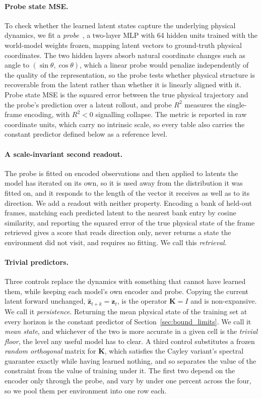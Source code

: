 \documentclass[10pt]{article} %
\newcommand{\K}{\mathbf{K}}
\newcommand{\z}{\bm{z}}
\begin{document}
\paragraph{Probe state MSE.}
To check whether the learned latent states capture the underlying physical dynamics, we fit a \emph{probe}~\citep{alain2016understanding}, a two-layer MLP with 64 hidden units trained with the world-model weights frozen, mapping latent vectors to ground-truth physical coordinates. The two hidden layers absorb natural coordinate changes such as angle to $(\sin\theta, \cos\theta)$, which a linear probe would penalize independently of the quality of the representation, so the probe tests whether physical structure is recoverable from the latent rather than whether it is linearly aligned with it. Probe state MSE is the squared error between the true physical trajectory and the probe's prediction over a latent rollout, and probe $R^2$ measures the single-frame encoding, with $R^2 < 0$ signalling collapse. The metric is reported in raw coordinate units, which carry no intrinsic scale, so every table also carries the constant predictor defined below as a reference level.

\paragraph{A scale-invariant second readout.}
The probe is fitted on encoded observations and then applied to latents the model has iterated on its own, so it is used away from the distribution it was fitted on, and it responds to the length of the vector it receives as well as to its direction. We add a readout with neither property. Encoding a bank of held-out frames, matching each predicted latent to the nearest bank entry by cosine similarity, and reporting the squared error of the true physical state of the frame retrieved gives a score that reads direction only, never returns a state the environment did not visit, and requires no fitting. We call this \emph{retrieval}.

\paragraph{Trivial predictors.}
Three controls replace the dynamics with something that cannot have learned them, while keeping each model's own encoder and probe. Copying the current latent forward unchanged, $\hat{\z}_{t+k} = \z_t$, is the operator $\K = I$ and is non-expansive. We call it \emph{persistence}. Returning the mean physical state of the training set at every horizon is the constant predictor of Section~\ref{sec:bound_limits}. We call it \emph{mean state}, and whichever of the two is more accurate in a given cell is the \emph{trivial floor}, the level any useful model has to clear. A third control substitutes a frozen \emph{random orthogonal} matrix for $\K$, which satisfies the Cayley variant's spectral guarantee exactly while having learned nothing, and so separates the value of the constraint from the value of training under it. The first two depend on the encoder only through the probe, and vary by under one percent across the four, so we pool them per environment into one row each.
\end{document}
